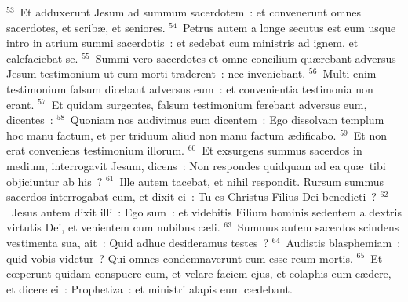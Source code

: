 ${}^{53}$~Et adduxerunt Jesum ad summum sacerdotem~: et convenerunt omnes sacerdotes, et scrib\ae , et seniores.
${}^{54}$~Petrus autem a longe secutus est eum usque intro in atrium summi sacerdotis~: et sedebat cum ministris ad ignem, et calefaciebat se.
${}^{55}$~Summi vero sacerdotes et omne concilium qu\ae rebant adversus Jesum testimonium ut eum morti traderent~: nec inveniebant.
${}^{56}$~Multi enim testimonium falsum dicebant adversus eum~: et convenientia testimonia non erant.
${}^{57}$~Et quidam surgentes, falsum testimonium ferebant adversus eum, dicentes~:
${}^{58}$~Quoniam nos audivimus eum dicentem~: Ego dissolvam templum hoc manu factum, et per triduum aliud non manu factum \ae dificabo.
${}^{59}$~Et non erat conveniens testimonium illorum.
${}^{60}$~Et exsurgens summus sacerdos in medium, interrogavit Jesum, dicens~: Non respondes quidquam ad ea qu\ae\ tibi objiciuntur ab his~?
${}^{61}$~Ille autem tacebat, et nihil respondit. Rursum summus sacerdos interrogabat eum, et dixit ei~: Tu es Christus Filius Dei benedicti~?
${}^{62}$~Jesus autem dixit illi~: Ego sum~: et videbitis Filium hominis sedentem a dextris virtutis Dei, et venientem cum nubibus c\ae li.
${}^{63}$~Summus autem sacerdos scindens vestimenta sua, ait~: Quid adhuc desideramus testes~?
${}^{64}$~Audistis blasphemiam~: quid vobis videtur~? Qui omnes condemnaverunt eum esse reum mortis.
${}^{65}$~Et cœperunt quidam conspuere eum, et velare faciem ejus, et colaphis eum c\ae dere, et dicere ei~: Prophetiza~: et ministri alapis eum c\ae debant.



